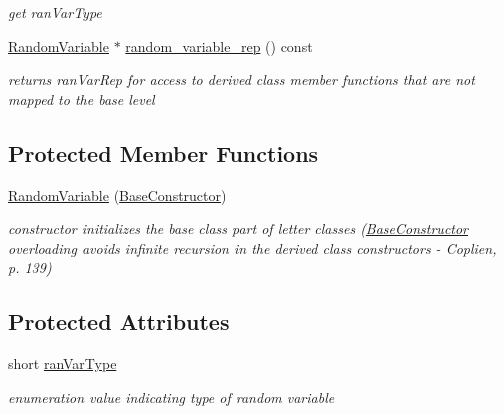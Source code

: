 \begin{DoxyCompactItemize}
\begin{DoxyCompactList}\small\item\em get ran\+Var\+Type \end{DoxyCompactList}\item 
\hyperlink{classPecos_1_1RandomVariable}{Random\+Variable} $\ast$ \hyperlink{classPecos_1_1RandomVariable_aeef1733cbc8c18094c89fc30402b7d8c}{random\+\_\+variable\+\_\+rep} () const \label{classPecos_1_1RandomVariable_aeef1733cbc8c18094c89fc30402b7d8c}

\begin{DoxyCompactList}\small\item\em returns ran\+Var\+Rep for access to derived class member functions that are not mapped to the base level \end{DoxyCompactList}\end{DoxyCompactItemize}
\subsection*{Protected Member Functions}
\begin{DoxyCompactItemize}
\item 
\hyperlink{classPecos_1_1RandomVariable_a98d08acae0e46903ca852b85a103c022}{Random\+Variable} (\hyperlink{structPecos_1_1BaseConstructor}{Base\+Constructor})
\begin{DoxyCompactList}\small\item\em constructor initializes the base class part of letter classes (\hyperlink{structPecos_1_1BaseConstructor}{Base\+Constructor} overloading avoids infinite recursion in the derived class constructors -\/ Coplien, p. 139) \end{DoxyCompactList}\end{DoxyCompactItemize}
\subsection*{Protected Attributes}
\begin{DoxyCompactItemize}
\item 
short \hyperlink{classPecos_1_1RandomVariable_a073e94936b94324877044cc02e5f5ea4}{ran\+Var\+Type}\label{classPecos_1_1RandomVariable_a073e94936b94324877044cc02e5f5ea4}

\begin{DoxyCompactList}\small\item\em enumeration value indicating type of random variable \end{DoxyCompactList}\end{DoxyCompactItemize}
